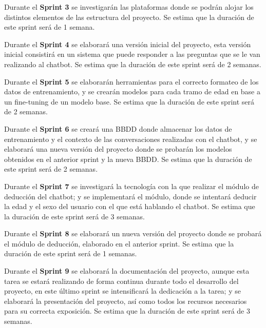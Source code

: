 Durante el \textbf{Sprint 3} se investigarán las plataformas donde se podrán alojar los distintos elementos de las estructura del proyecto. Se estima que la duración de este sprint será de 1 semana.

Durante el \textbf{Sprint 4} se elaborará una versión inicial del proyecto, esta versión inicial consistirá en un sistema que puede responder a las preguntas que se le van realizando al chatbot. Se estima que la duración de este sprint será de 2 semanas.

Durante el \textbf{Sprint 5} se elaborarán herramientas para el correcto formateo de los datos de entrenamiento, y se crearán modelos para cada tramo de edad en base a un fine-tuning de un modelo base. Se estima que la duración de este sprint será de 2 semanas.

Durante el \textbf{Sprint 6} se creará una BBDD donde almacenar los datos de entrenamiento y el contexto de las conversaciones realizadas con el chatbot, y se elaborará una nueva versión del proyecto donde se probarán los modelos obtenidos en el anterior sprint y la nueva BBDD. Se estima que la duración de este sprint será de 2 semanas.

Durante el \textbf{Sprint 7} se investigará la tecnología con la que realizar el módulo de deducción del chatbot; y se implementará el módulo, donde se intentará deducir la edad y el sexo del usuario con el que está hablando el chatbot. Se estima que la duración de este sprint será de 3 semanas.

Durante el \textbf{Sprint 8} se elaborará un nueva versión del proyecto donde se probará el módulo de deducción, elaborado en el anterior sprint. Se estima que la duración de este sprint será de 1 semanas.

Durante el \textbf{Sprint 9} se elaborará la documentación del proyecto, aunque esta tarea se estará realizando de forma continua durante todo el desarrollo del proyecto, en este último sprint se intensificará la dedicación a la tarea; y se elaborará la presentación del proyecto, así como todos los recursos necesarios para su correcta exposición. Se estima que la duración de este sprint será de 3 semanas.



